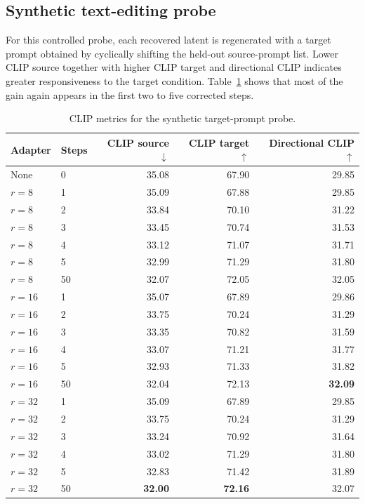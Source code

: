\documentclass{article} %
\begin{document}
\subsection{Synthetic text-editing probe}
For this controlled probe, each recovered latent is regenerated with a target prompt obtained by cyclically shifting the held-out source-prompt list. Lower CLIP source together with higher CLIP target and directional CLIP indicates greater responsiveness to the target condition. Table~\ref{tab:clip-editing-ablation} shows that most of the gain again appears in the first two to five corrected steps.
\begin{table}[t]
    \centering
    \scriptsize
    \caption{CLIP metrics for the synthetic target-prompt probe. }
    \label{tab:clip-editing-ablation}
    \begin{tabular}{llrrr}
        \toprule
        Adapter & Steps & CLIP source $\downarrow$ & CLIP target $\uparrow$ & Directional CLIP $\uparrow$ \\
        \midrule
        None & 0 & 35.08 & 67.90 & 29.85 \\
        $r=8$ & 1 & 35.09 & 67.88 & 29.85 \\
        $r=8$ & 2 & 33.84 & 70.10 & 31.22 \\
        $r=8$ & 3 & 33.45 & 70.74 & 31.53 \\
        $r=8$ & 4 & 33.12 & 71.07 & 31.71 \\
        $r=8$ & 5 & 32.99 & 71.29 & 31.80 \\
        $r=8$ & 50 & 32.07 & 72.05 & 32.05 \\
        \midrule
        $r=16$ & 1 & 35.07 & 67.89 & 29.86 \\
        $r=16$ & 2 & 33.75 & 70.24 & 31.29 \\
        $r=16$ & 3 & 33.35 & 70.82 & 31.59 \\
        $r=16$ & 4 & 33.07 & 71.21 & 31.77 \\
        $r=16$ & 5 & 32.93 & 71.33 & 31.82 \\
        $r=16$ & 50 & 32.04 & 72.13 & \textbf{32.09} \\
        \midrule
        $r=32$ & 1 & 35.09 & 67.89 & 29.85 \\
        $r=32$ & 2 & 33.75 & 70.24 & 31.29 \\
        $r=32$ & 3 & 33.24 & 70.92 & 31.64 \\
        $r=32$ & 4 & 33.02 & 71.29 & 31.80 \\
        $r=32$ & 5 & 32.83 & 71.42 & 31.89 \\
        $r=32$ & 50 & \textbf{32.00} & \textbf{72.16} & 32.07 \\
        \bottomrule
    \end{tabular}
\end{table}
\end{document}
